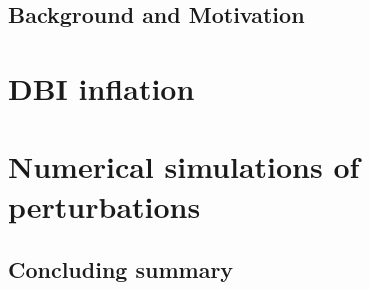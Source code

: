 \documentclass[
12pt,
doublespacing
]
{icldt}
\begin{document}


\begin{doublespace}





\tableofcontents
\listoffigures
\chapter{Background and Motivation}
\label{MainIntro}
% 
\part{DBI inflation}
\label{part:dbi}
% 

% 

\part{Numerical simulations of perturbations}
\label{part:numerical}

\chapter{Concluding summary}

% 
\end{doublespace}
% 
% 
\end{document}
